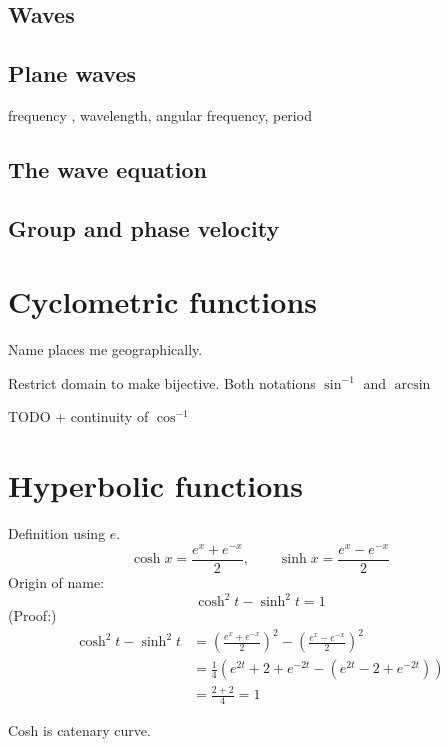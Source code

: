\subsection{Waves}
\subsection{Plane waves}
frequency , wavelength, angular frequency, period

\subsection{The wave equation}

\subsection{Group and phase velocity}

\section{Cyclometric functions}
Name places me geographically.

Restrict domain to make bijective.
Both notations $\sin^{-1}$ and $\arcsin$

TODO + continuity of $\cos^{-1}$

\section{Hyperbolic functions}
Definition using $e$.
\[ \cosh x = \frac{e^x + e^{-x}}{2}, \qquad \sinh x = \frac{e^x - e^{-x}}{2} \]
Origin of name:
\[ \cosh^2 t - \sinh^2 t = 1 \]
(Proof:)
\begin{align*}
\cosh^2 t - \sinh^2 t &= \left(\frac{e^x + e^{-x}}{2}\right)^2 - \left(\frac{e^x - e^{-x}}{2}\right)^2 \\
&= \frac{1}{4}\left(e^{2t} + 2 + e^{-2t} - (e^{2t} - 2 + e^{-2t})\right) \\
&= \frac{2+2}{4} = 1
\end{align*}

Cosh is catenary curve.

